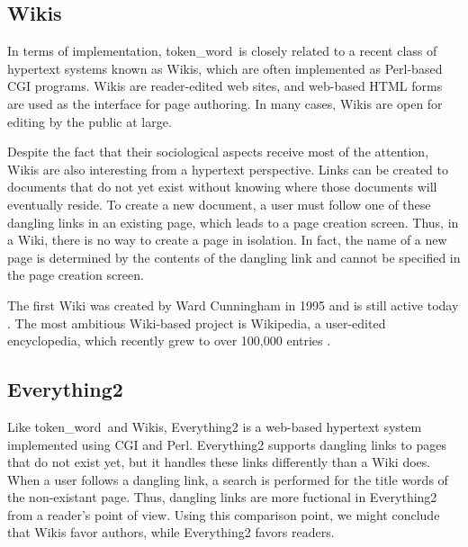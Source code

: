 \documentclass{acm_proc_article-sp}
\newcommand{\tw}{token\_word}
\begin{document}
\subsection{Wikis}

In terms of implementation, \tw \  is closely related to a recent class of hypertext systems known as Wikis, which are often implemented as Perl-based CGI programs.
Wikis are reader-edited web sites, and web-based HTML forms are used as the interface for page authoring.
In many cases, Wikis are open for editing by the public at large.

Despite the fact that their sociological aspects receive most of the attention, Wikis are also interesting from a hypertext perspective.
Links can be created to documents that do not yet exist without knowing where those documents will eventually reside.
To create a new document, a user must follow one of these dangling links in an existing page, which leads to a page creation screen.
Thus, in a Wiki, there is no way to create a page in isolation.
In fact, the name of a new page is determined by the contents of the dangling link and cannot be specified in the page creation screen.



The first Wiki was created by Ward Cunningham in 1995 and is still active today \cite{WikiWikiWeb}.
The most ambitious Wiki-based project is Wikipedia, a user-edited encyclopedia, which recently grew to over 100,000 entries \cite{Wikipedia}.


\subsection{Everything2}
Like \tw \  and Wikis, Everything2 \cite{Everything2} is a web-based hypertext system implemented using CGI and Perl.
Everything2 supports dangling links to pages that do not exist yet, but it handles these links differently than a Wiki does.
When a user follows a dangling link, a search is performed for the title words of the non-existant page.
Thus, dangling links are more fuctional in Everything2 from a reader's point of view.
Using this comparison point, we might conclude that Wikis favor authors, while Everything2 favors readers.
\end{document}
